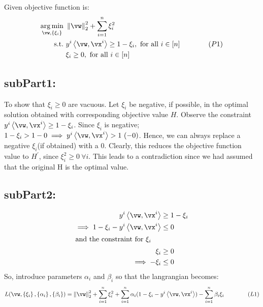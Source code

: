 \documentclass[a4paper,11pt]{article}
\begin{document}
\begin{mlsolution}
	Given objective function is:
\begin{align*}
\underset{\vw,\bc{\xi_i}}{\arg\min}&\ \norm{\vw}_2^2 + \sum_{i=1}^n\xi_i^2\\
\text{s.t.} &\ y^i\ip{\vw}{\vx^i} \geq 1 - \xi_i, \text{ for all } i \in [n] \qquad\qquad(P1)\\
&\ \xi_i \geq 0, \text{ for all } i \in [n]
\end{align*}

\subsection{subPart1:}
To show that $\xi_i \geq 0$ are vacuous. Let $\xi_i$ be negative, if possible, in the optimal solution obtained with corresponding objective value $H$. Observe the constraint $y^i\ip{\vw}{\vx^i} \geq 1 - \xi_i$. Since $\xi_i$ is negative; $1 - \xi_i > 1 - 0 \implies y^i\ip{\vw}{\vx^i} > 1\ (-0) $. Hence, we can always replace a negative $\xi_i$(if obtained) with a 0. Clearly, this reduces the objective function value to $H^{\prime}$, since $\xi_i^2 \geq 0\ \forall i$. This leads to a contradiction since we had assumed that the original H is the optimal value.
\subsection{subPart2:}
\begin{align*}
	y^i\ip{\vw}{\vx^i} &\geq 1 - \xi_i\\
	\implies 1 - \xi_i - y^i\ip{\vw}{\vx^i} &\leq 0\\
	\intertext{and the constraint for $\xi_i$}
	\xi_i &\geq 0\\
	\implies -\xi_i &\leq 0
\end{align*}
So, introduce parameters $\alpha_i$ and $\beta_i$  so that the langrangian becomes:
$$ L(\vw,\bc{\xi_i}, \bc{\alpha_i}, \bc{\beta_i}) = \norm{\vw}_2^2 + \sum_{i=1}^n\xi_i^2 + \sum_{i=1}^n \alpha_i(1 - \xi_i - y^i\ip{\vw}{\vx^i}) - \sum_{i=1}^{n}\beta_i\xi_i \qquad\qquad(L1)$$
					

\end{mlsolution}
\end{document}
